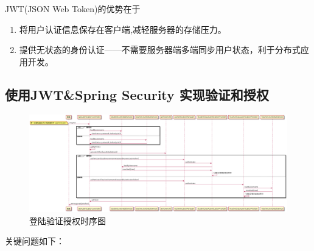 JWT(JSON Web Token)的优势在于
\begin{enumerate}
  \item 将用户认证信息保存在客户端,减轻服务器的存储压力。
  \item 提供无状态的身份认证——不需要服务器端多端同步用户状态，利于分布式应用开发。\cite{.2019h}
\end{enumerate}


\subsection{使用JWT\&Spring Security 实现验证和授权}

\begin{figure}[H]
  \centering
  \includegraphics[scale = 0.27, angle = 90]{out/uml/时序图/时序图-authentication/时序图-authentication.png}
  \caption{\song\wuhao 登陆验证授权时序图}
\end{figure}

关键问题如下：

